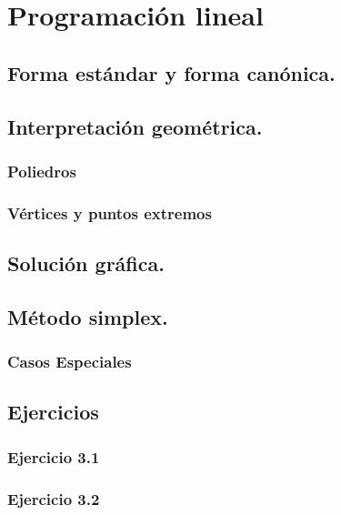 \section{Programación lineal}

\subsection{Forma estándar y forma canónica.}

\subsection{Interpretación geométrica.}

\subsubsection{Poliedros}

\subsubsection{Vértices y puntos extremos}

\subsection{Solución gráfica.}

\subsection{Método simplex.}

\subsubsection{Casos Especiales}

\subsection{Ejercicios}

\subsubsection{Ejercicio 3.1}


\subsubsection{Ejercicio 3.2}


